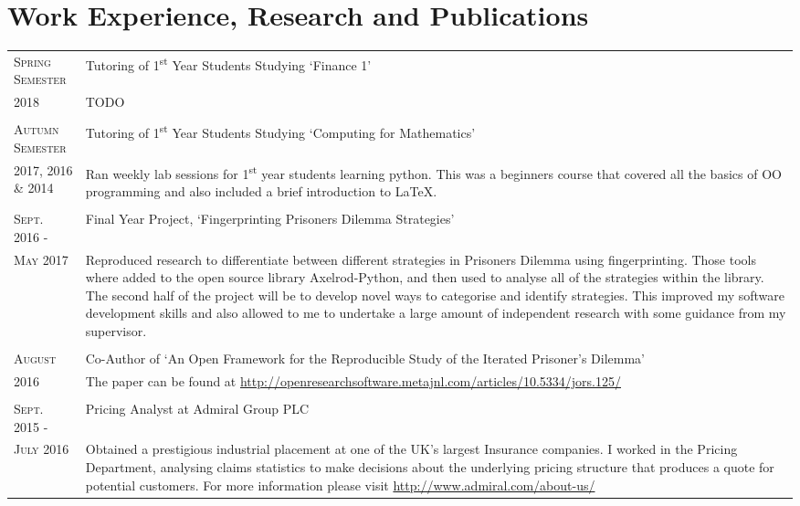 \documentclass[a4paper]{article}
\begin{document}
\section{Work Experience, Research and Publications}
\begin{tabularx}{\textwidth}{lX}
\textsc{Spring Semester} & Tutoring of 1\textsuperscript{st} Year Students Studying `Finance 1'\\
\textsc{2018} & \footnotesize{TODO}
\\
\\
\textsc{Autumn Semester} & Tutoring of 1\textsuperscript{st} Year Students Studying `Computing for Mathematics'\\
\textsc{2017, 2016 \& 2014} & \footnotesize{Ran weekly lab sessions for 1\textsuperscript{st} year students learning python. This was a beginners course that covered all the basics of OO programming and also included a brief introduction to \LaTeX.}
\\
\\
\textsc{Sept. 2016 - } & Final Year Project, `Fingerprinting Prisoners Dilemma Strategies'\\
\textsc{May 2017} & \footnotesize{Reproduced research to differentiate between different strategies in Prisoners Dilemma using fingerprinting. Those tools where added to the open source library Axelrod-Python, and then used to analyse all of the strategies within the library. The second half of the project will be to develop novel ways to categorise and identify strategies. This improved my software development skills and also allowed to me to undertake a large amount of independent research with some guidance from my supervisor.}
\\
\\
\textsc{August} & Co-Author of `An Open Framework for the Reproducible Study of the Iterated Prisoner’s Dilemma' \\
\textsc{2016} & \footnotesize{The paper can be found at \url{http://openresearchsoftware.metajnl.com/articles/10.5334/jors.125/}}
\\
\\
\textsc{Sept. 2015 -} & Pricing Analyst at Admiral Group PLC \\
\textsc{July 2016} & \footnotesize{Obtained a prestigious industrial placement at one of the UK's largest Insurance companies. I worked in the Pricing Department, analysing claims statistics to make decisions about the underlying pricing structure that produces a quote for potential customers. For more information please visit \url{http://www.admiral.com/about-us/}}

\end{tabularx}
\end{document}
